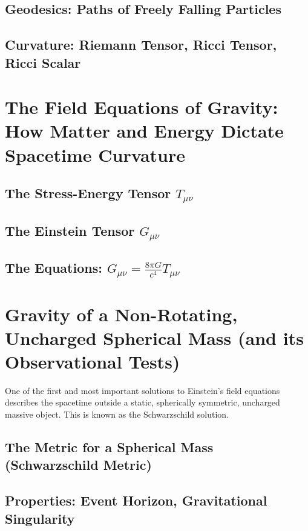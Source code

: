 \documentclass{amsart}
\theoremstyle{definition}
\theoremstyle{remark}
\begin{document}
\subsection{Geodesics: Paths of Freely Falling Particles}
\subsection{Curvature: Riemann Tensor, Ricci Tensor, Ricci Scalar}

\section{The Field Equations of Gravity: How Matter and Energy Dictate Spacetime Curvature}
\label{sec:efe}
\subsection{The Stress-Energy Tensor $T_{\mu\nu}$}
\subsection{The Einstein Tensor $G_{\mu\nu}$}
\subsection{The Equations: $G_{\mu\nu} = \frac{8\pi G}{c^4} T_{\mu\nu}$}

\section{Gravity of a Non-Rotating, Uncharged Spherical Mass (and its Observational Tests)}
\label{sec:schwarzschild_tests}
One of the first and most important solutions to Einstein's field equations describes the spacetime outside a static, spherically symmetric, uncharged massive object.
This is known as the Schwarzschild solution.

\subsection{The Metric for a Spherical Mass (Schwarzschild Metric)}

\subsection{Properties: Event Horizon, Gravitational Singularity}
\end{document}
